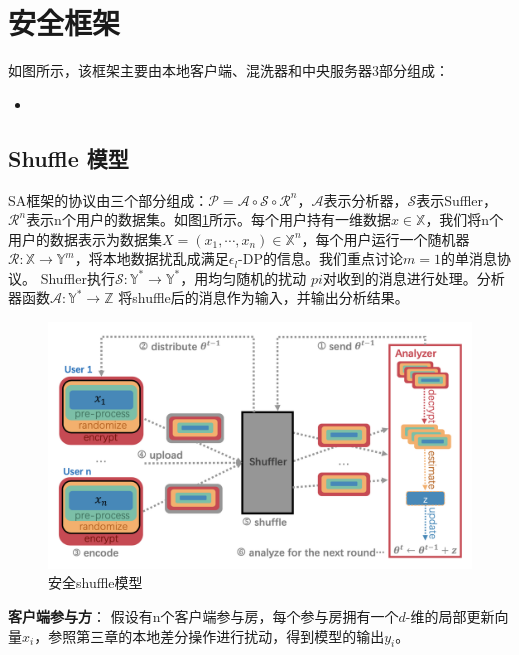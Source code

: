 \section{安全框架}
如图所示，该框架主要由本地客户端、混洗器和中央服务器3部分组成：
\begin{itemize}
  \item 
\end{itemize}

\subsection{Shuffle 模型}
SA框架的协议由三个部分组成：$\mathcal{P}=\mathcal{A} \circ \mathcal{S} \circ \mathcal{R}^{n}$，$\mathcal{A}$表示分析器，$\mathcal{S}$表示Suffler，$\mathcal{R}^{n}$表示n个用户的数据集。如图\ref{fig:shuffle模型}所示。每个用户持有一维数据$x \in \mathbb{X}$，我们将n个用户的数据表示为数据集$X=\left(x_{1}, \cdots, x_{n}\right) \in \mathbb{X}^{n}$，每个用户运行一个随机器$\mathcal{R}: \mathbb{X} \rightarrow \mathbb{Y}^{m}$，将本地数据扰乱成满足$\epsilon_{l}$-DP的信息。我们重点讨论$m=1$的单消息协议。 Shuffler执行$\mathcal{S}: \mathbb{Y}^{*} \rightarrow \mathbb{Y}^{*}$，用均匀随机的扰动 $pi$对收到的消息进行处理。分析器函数$\mathcal{A}: \mathbb{Y}^{*} \rightarrow \mathbb{Z}$ 将shuffle后的消息作为输入，并输出分析结果。

\begin{figure}[!hbt]
\centering
  \includegraphics[scale=0.4]{fig2/C4/shuffle模型}%
  \caption{安全shuffle模型}
  \label{fig:shuffle模型} 
\end{figure}

\textbf{客户端参与方}：
假设有n个客户端参与房，每个参与房拥有一个$d$-维的局部更新向量$x_{i}$，参照第三章的本地差分操作进行扰动，得到模型的输出$y_{i}$。

